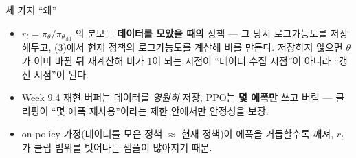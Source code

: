 \begin{frame}{세 가지 ``왜''}
  \small
  \begin{itemize}
    \item {}
      $r_t=\pi_\theta/\pi_{\theta_{\mathrm{old}}}$ 의 분모는
      \textbf{데이터를 모았을 때의} 정책 — 그 당시 로그가능도를
      저장해두고, (3)에서 현재 정책의 로그가능도를 계산해 비를
      만든다. 저장하지 않으면 $\theta$ 가 이미 바뀐 뒤 재계산해
      비가 1이 되는 시점이 ``데이터 수집 시점''이 아니라
      ``갱신 시점''이 된다.
    \item {} Week 9.4 재현 버퍼는
      데이터를 \textit{영원히} 저장, PPO는 \textbf{몇 에폭만}
      쓰고 버림 — 클리핑이 ``몇 에폭 재사용''이라는 제한 안에서만
      안정성을 보장.
    \item {} on-policy 가정(데이터를 모은
      정책 $\approx$ 현재 정책)이 에폭을 거듭할수록 깨져, $r_t$ 가
      클립 범위를 벗어나는 샘플이 많아지기 때문.
  \end{itemize}
\end{frame}
